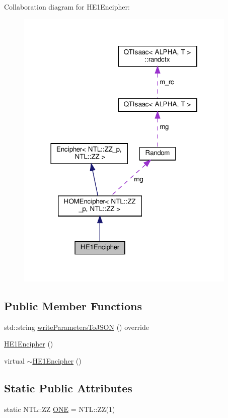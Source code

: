 Collaboration diagram for H\+E1\+Encipher\+:
\nopagebreak
\begin{figure}[H]
\begin{center}
\leavevmode
\includegraphics[width=298pt]{classHE1Encipher__coll__graph}
\end{center}
\end{figure}
\subsection*{Public Member Functions}
\begin{DoxyCompactItemize}
\item 
std\+::string \hyperlink{classHE1Encipher_a0aa1ef94d9147591367dbbc6ce03e5e1}{write\+Parameters\+To\+J\+S\+ON} () override
\item 
\hyperlink{classHE1Encipher_ad9128098166937e3569c4414aa1af689}{H\+E1\+Encipher} ()
\item 
virtual \hyperlink{classHE1Encipher_a5ffc18928bd189107151cb5a16c8cc5c}{$\sim$\+H\+E1\+Encipher} ()
\end{DoxyCompactItemize}
\subsection*{Static Public Attributes}
\begin{DoxyCompactItemize}
\item 
static N\+T\+L\+::\+ZZ \hyperlink{classHE1Encipher_a9c4f95a1461ec32d6e96db7c67aabdf3}{O\+NE} = N\+T\+L\+::\+ZZ(1)
\end{DoxyCompactItemize}
